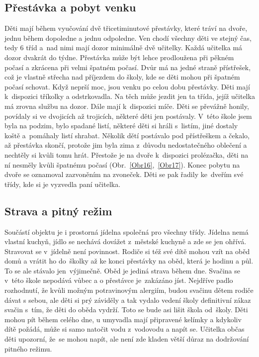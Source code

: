 		\subsection{Přestávka a pobyt venku}
		\label{prestavka}
			Děti mají během vyučování dvě třicetiminutové přestávky, které tráví na dvoře, jednu během dopoledne a jednu odpoledne. Ven chodí všechny děti ve stejný čas, tedy 6 tříd a nad nimi mají dozor minimálně dvě učitelky. Každá učitelka má dozor dvakrát do týdne. Přestávka může být lehce prodloužena při pěkném počasí a zkrácena při velmi špatném počasí. Dvůr má na jedné straně přístřešek, což je vlastně střecha nad příjezdem do školy, kde se děti mohou při špatném počasí schovat. Když neprší moc, jsou venku po celou dobu přestávky. Děti mají k dispozici tříkolky a odstrkovadla. Na těch může jezdit jen ta třída, jejíž učitelka má zrovna službu na dozor. Dále mají k dispozici míče. Děti se převážně honily, povídaly si ve dvojicích až trojicích, některé děti jen postávaly. V této škole jsem byla na podzim, bylo spadané listí, některé děti si hráli s listím, jiné dostaly koště a pomáhaly listí shrabat. Několik dětí postávalo pod přístřeškem a čekalo, až přestávka skončí, protože jim byla zima z důvodu nedostatečného oblečení a nechtěly si kvůli tomu hrát. Přestože je na dvoře k dispozici prolézačka, děti na ní nesměly kvůli špatnému počasí (Obr.~\ref{Obr16},~\ref{Obr17}). 
			Konec pobytu na dvoře se oznamoval zazvoněním na zvoneček. Děti se pak řadily ke dveřím své třídy, kde si je vyzvedla paní učitelka. 

		\subsection{Strava a pitný režim}
			Součástí objektu je i prostorná jídelna společná pro všechny třídy. Jídelna nemá vlastní kuchyň, jídlo se nechává dovážet z městské kuchyně a zde se jen ohřívá. Stravovat se v jídelně není povinnost. Rodiče si též své dítě mohou vzít na oběd domů a vrátit ho do školky až ke konci přestávky na oběd, která je hodinu a půl. To se ale stávalo jen výjimečně.
			Oběd je jediná strava během dne. Svačina se v této škole nepodává vůbec a o přestávce je zakázáno jíst. Nejdříve padlo rozhodnutí, že kvůli možným potravinovým alergiím, budou svačinu dětem rodiče dávat s sebou, ale děti si prý záviděly a tak vydalo vedení školy definitivní zákaz svačin s tím, že děti do oběda vydrží. Toto se bude asi lišit škola od školy.
			Děti mohou pít během celého dne, u umyvadla mají připravené kelímky a kdykoliv dítě požádá, může si samo natočit vodu z vodovodu a napít se. Učitelka občas děti upozorní, že se mohou napít, ale není zde kladen větší důraz na dodržování pitného režimu.

